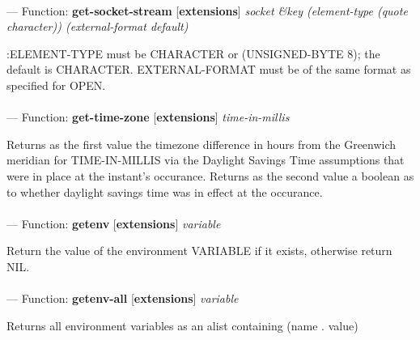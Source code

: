\paragraph{}
\label{EXTENSIONS:GET-SOCKET-STREAM}
--- Function: \textbf{get-socket-stream} [\textbf{extensions}] \textit{socket \&key (element-type (quote character)) (external-format default)}

\begin{adjustwidth}{5em}{5em}
:ELEMENT-TYPE must be CHARACTER or (UNSIGNED-BYTE 8); the default is CHARACTER.
EXTERNAL-FORMAT must be of the same format as specified for OPEN.
\end{adjustwidth}

\paragraph{}
\label{EXTENSIONS:GET-TIME-ZONE}
--- Function: \textbf{get-time-zone} [\textbf{extensions}] \textit{time-in-millis}

\begin{adjustwidth}{5em}{5em}
Returns as the first value the timezone difference in hours from the Greenwich meridian for TIME-IN-MILLIS via the Daylight Savings Time assumptions that were in place at the instant's occurance.  Returns as the second value a boolean as to whether daylight savings time was in effect at the occurance.
\end{adjustwidth}

\paragraph{}
\label{EXTENSIONS:GETENV}
--- Function: \textbf{getenv} [\textbf{extensions}] \textit{variable}

\begin{adjustwidth}{5em}{5em}
Return the value of the environment VARIABLE if it exists, otherwise return NIL.
\end{adjustwidth}

\paragraph{}
\label{EXTENSIONS:GETENV-ALL}
--- Function: \textbf{getenv-all} [\textbf{extensions}] \textit{variable}

\begin{adjustwidth}{5em}{5em}
Returns all environment variables as an alist containing (name . value)
\end{adjustwidth}

